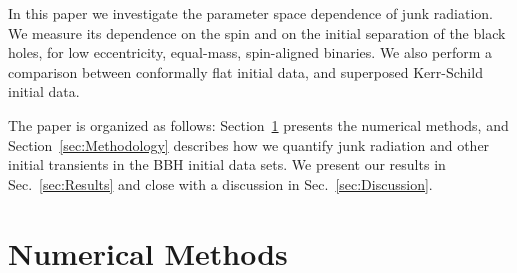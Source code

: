 In this paper we investigate the parameter space dependence of junk
radiation. We measure its dependence on the spin and on the initial
separation of the black holes, for low eccentricity, equal-mass,
spin-aligned binaries. We also perform a comparison between conformally
flat initial data, and superposed Kerr-Schild initial data.

The paper is organized as follows: 
  Section~\ref{sec:NumericalMethods} presents the numerical methods,
  and Section~\ref{sec:Methodology} describes how we quantify junk
  radiation and other initial transients in the BBH initial data sets.
  We present our results in Sec.~\ref{sec:Results} and close with a discussion in Sec.~\ref{sec:Discussion}.

\section{Numerical Methods}
\label{sec:NumericalMethods}

